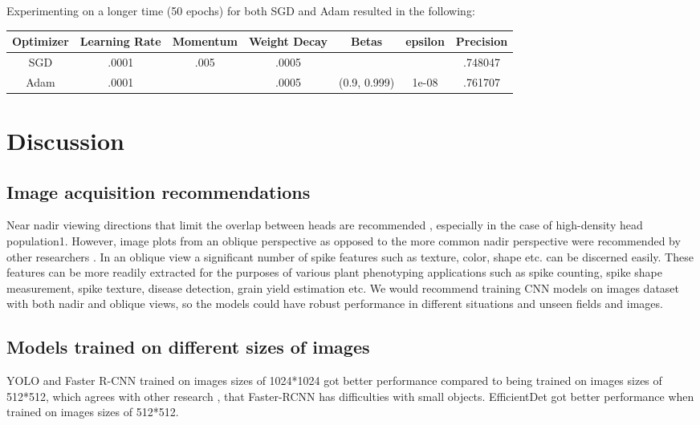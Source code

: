 \documentclass[utf8]{frontiersSCNS} %
\begin{document}
Experimenting on a longer time (50 epochs) for both SGD and Adam resulted in the following:

\begin{center}
\begin{tabular}{||c c c c c c c||} 
\hline
Optimizer & Learning Rate & Momentum & Weight Decay & Betas & epsilon & Precision\\
\hline\hline
SGD & .0001 & .005 & .0005 & & & .748047 \\ 
\hline
Adam & .0001 &  & .0005 & (0.9, 0.999) & 1e-08 & .761707 \\ 
\hline
\end{tabular}
\end{center}

\section{Discussion}

\subsection{Image acquisition recommendations}
Near nadir viewing directions that limit the overlap between heads are recommended \citep{david2020global}, especially in the case of high-density head population1. However, image plots from an oblique perspective as opposed to the more common nadir perspective were recommended by other researchers \citep{hasan2018detection}. In an oblique view a significant number of spike features such as texture, color, shape etc. can be discerned easily. These features can be more readily extracted for the purposes of various plant phenotyping applications such as spike counting, spike shape measurement, spike texture, disease detection, grain yield estimation etc.
We would recommend training CNN models on images dataset with both nadir and oblique views, so the models could have robust performance in different situations and unseen fields and images. 
\subsection{Models trained on different sizes of images}
YOLO and Faster R-CNN trained on images sizes of 1024*1024 got better performance compared to being trained on images sizes of 512*512, which agrees with other research \citep{eggert2017closer}, that Faster-RCNN has difficulties with small objects. EfficientDet got better performance when trained on images sizes of 512*512.
\end{document}
